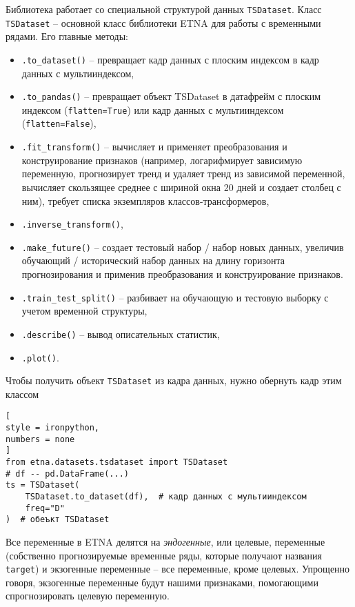 \documentclass[%
	11pt,
	a4paper,
	utf8,
		]{article}
\begin{document}
Библиотека работает со специальной структурой данных \verb|TSDataset|. Класс \verb|TSDataset| -- основной класс библиотеки ETNA для работы с временными рядами. Его главные методы:
\begin{itemize}
	\item \verb|.to_dataset()| -- превращает кадр данных с плоским индексом в кадр данных с мультииндексом,
	
	\item \verb|.to_pandas()| -- превращает объект TSDataset в датафрейм с плоским индексом (\verb|flatten=True|) или кадр данных с мультииндексом (\verb|flatten=False|),
	
	\item \verb|.fit_transform()| -- вычисляет и применяет преобразования и конструирование признаков (например, логарифмирует зависимую переменную, прогнозирует тренд и удаляет тренд из зависимой переменной, вычисляет скользящее среднее с шириной окна 20 дней и создает столбец с ним), требует списка экземпляров классов-трансформеров,
	
	\item \verb|.inverse_transform()|,
	
	\item \verb|.make_future()| -- создает тестовый набор / набор новых данных, увеличив обучающий / исторический набор данных на длину горизонта прогнозирования и применив преобразования и конструирование признаков.
	
	\item \verb|.train_test_split()| -- разбивает на обучающую и тестовую выборку с учетом временной структуры,
	
	\item \verb|.describe()| -- вывод описательных статистик,
	
	\item \verb|.plot()|.
\end{itemize}

Чтобы получить объект \verb|TSDataset| из кадра данных, нужно обернуть кадр этим классом
\begin{lstlisting}[
style = ironpython,
numbers = none
]
from etna.datasets.tsdataset import TSDataset
# df -- pd.DataFrame(...)
ts = TSDataset(
    TSDataset.to_dataset(df),  # кадр данных с мультииндексом
    freq="D"
)  # обеъкт TSDataset
\end{lstlisting}

Все переменные в ETNA делятся на \emph{эндогенные}, или целевые, переменные (собственно прогнозируемые временные ряды, которые получают названия \verb|target|) и экзогенные переменные -- все переменные, кроме целевых. Упрощенно говоря, экзогенные переменные будут нашими признаками, помогающими спрогнозировать целевую переменную.
\end{document}
